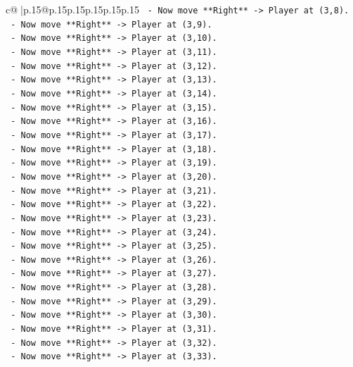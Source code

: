 \documentclass{article}
\begin{document}
{\begin{supertabular}{c@{$\;$}|p{.15\linewidth}@{}p{.15\linewidth}p{.15\linewidth}p{.15\linewidth}p{.15\linewidth}p{.15\linewidth}}
{{{\texttt{    {-}   Now move **Right** {-}> Player at (3,8).} \\
\texttt{    {-}   Now move **Right** {-}> Player at (3,9).} \\
\texttt{    {-}   Now move **Right** {-}> Player at (3,10).} \\
\texttt{    {-}   Now move **Right** {-}> Player at (3,11).} \\
\texttt{    {-}   Now move **Right** {-}> Player at (3,12).} \\
\texttt{    {-}   Now move **Right** {-}> Player at (3,13).} \\
\texttt{    {-}   Now move **Right** {-}> Player at (3,14).} \\
\texttt{    {-}   Now move **Right** {-}> Player at (3,15).} \\
\texttt{    {-}   Now move **Right** {-}> Player at (3,16).} \\
\texttt{    {-}   Now move **Right** {-}> Player at (3,17).} \\
\texttt{    {-}   Now move **Right** {-}> Player at (3,18).} \\
\texttt{    {-}   Now move **Right** {-}> Player at (3,19).} \\
\texttt{    {-}   Now move **Right** {-}> Player at (3,20).} \\
\texttt{    {-}   Now move **Right** {-}> Player at (3,21).} \\
\texttt{    {-}   Now move **Right** {-}> Player at (3,22).} \\
\texttt{    {-}   Now move **Right** {-}> Player at (3,23).} \\
\texttt{    {-}   Now move **Right** {-}> Player at (3,24).} \\
\texttt{    {-}   Now move **Right** {-}> Player at (3,25).} \\
\texttt{    {-}   Now move **Right** {-}> Player at (3,26).} \\
\texttt{    {-}   Now move **Right** {-}> Player at (3,27).} \\
\texttt{    {-}   Now move **Right** {-}> Player at (3,28).} \\
\texttt{    {-}   Now move **Right** {-}> Player at (3,29).} \\
\texttt{    {-}   Now move **Right** {-}> Player at (3,30).} \\
\texttt{    {-}   Now move **Right** {-}> Player at (3,31).} \\
\texttt{    {-}   Now move **Right** {-}> Player at (3,32).} \\
\texttt{    {-}   Now move **Right** {-}> Player at (3,33).} \\
}}}
\end{supertabular}}
\end{document}
